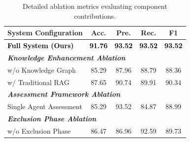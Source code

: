 \begin{table}[!t]
\centering
\caption{Detailed ablation metrics evaluating component contributions.}
\label{tab:ablation_study}
\begin{tabular}{@{}lcccc@{}}
\toprule
\textbf{System Configuration} & \textbf{Acc.} & \textbf{Pre.} & \textbf{Rec.} & \textbf{F1} \\
\midrule

\textcolor{black}{\textbf{Full System (Ours)}} & 
\textcolor{black}{\textbf{91.76}} & 
\textcolor{black}{\textbf{93.52}} & 
\textcolor{black}{\textbf{93.52}} & 
\textcolor{black}{\textbf{93.52}} \\
\midrule

\multicolumn{5}{l}{\textit{\textbf{Knowledge Enhancement Ablation}}} \\
w/o Knowledge Graph & 85.29 & 87.96 & 88.79 & 88.36 \\
w/ Traditional RAG & 87.65 & 90.74 & 89.91 & 90.34 \\
\midrule

\multicolumn{5}{l}{\textit{\textbf{Assessment Framework Ablation}}} \\
Single Agent Assessment & 85.29 & 93.52 & 84.87 & 88.99 \\
\midrule

\multicolumn{5}{l}{\textit{\textbf{Exclusion Phase Ablation}}} \\
w/o Exclusion Phase & 86.47 & 86.96 & 92.59 & 89.73 \\

\bottomrule
\end{tabular}
\end{table}
